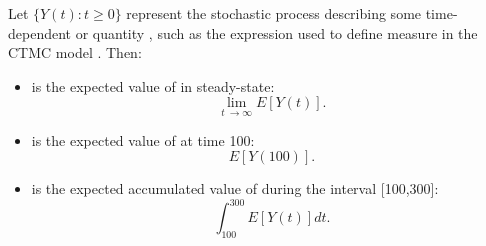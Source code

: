 Let $\{Y(t):t\geq 0\}$ represent the stochastic process describing
some time-dependent  or  quantity ,
such as the expression 
used to define measure  in the CTMC model .
Then:
\begin{itemize}
\item {} is
the expected value of  in steady-state:
$$\lim_{t\ \rightarrow \infty} E[Y(t)].$$
\item {} is
the expected value of  at time 100:
$$E[Y(100)].$$
\item {} is
the expected accumulated value of  during the interval [100,300]:
$$\int_{100}^{300} E[Y(t)] dt.$$
\end{itemize}




